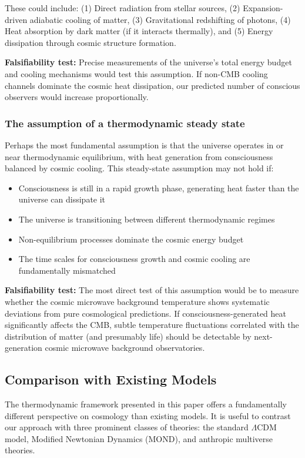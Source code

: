 \documentclass[11pt,a4paper]{article}
\theoremstyle{definition}
\theoremstyle{remark}
\begin{document}
These could include: (1) Direct radiation from stellar sources, (2) Expansion-driven adiabatic cooling of matter, (3) Gravitational redshifting of photons, (4) Heat absorption by dark matter (if it interacts thermally), and (5) Energy dissipation through cosmic structure formation.

\textbf{Falsifiability test:} Precise measurements of the universe's total energy budget and cooling mechanisms would test this assumption. If non-CMB cooling channels dominate the cosmic heat dissipation, our predicted number of conscious observers would increase proportionally.

\subsubsection{The assumption of a thermodynamic steady state}

Perhaps the most fundamental assumption is that the universe operates in or near thermodynamic equilibrium, with heat generation from consciousness balanced by cosmic cooling. This steady-state assumption may not hold if:

\begin{itemize}
    \item Consciousness is still in a rapid growth phase, generating heat faster than the universe can dissipate it
    \item The universe is transitioning between different thermodynamic regimes
    \item Non-equilibrium processes dominate the cosmic energy budget
    \item The time scales for consciousness growth and cosmic cooling are fundamentally mismatched
\end{itemize}

\textbf{Falsifiability test:} The most direct test of this assumption would be to measure whether the cosmic microwave background temperature shows systematic deviations from pure cosmological predictions. If consciousness-generated heat significantly affects the CMB, subtle temperature fluctuations correlated with the distribution of matter (and presumably life) should be detectable by next-generation cosmic microwave background observatories.

\subsection{Comparison with Existing Models}

The thermodynamic framework presented in this paper offers a fundamentally different perspective on cosmology than existing models. It is useful to contrast our approach with three prominent classes of theories: the standard \(\Lambda\)CDM model, Modified Newtonian Dynamics (MOND), and anthropic multiverse theories.
\end{document}
